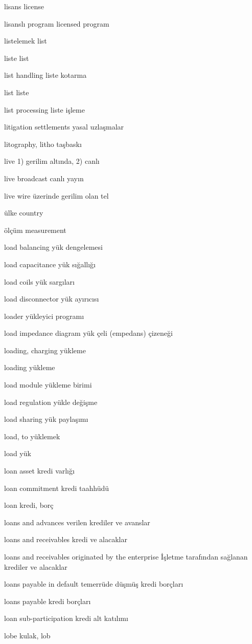 \documentclass[12pt,fleqn]{article}\usepackage{../../common}
\begin{document}
lisans license

lisanslı program licensed program

listelemek list

liste list

list handling liste kotarma

list liste

list processing liste işleme

litigation settlements yasal uzlaşmalar

litography, litho taşbaskı

live 1) gerilim altında, 2) canlı

live broadcast canlı yayın

live wire üzerinde gerilim olan tel

ülke country

ölçüm measurement

load balancing yük dengelemesi

load capacitance yük sığallığı

load coils yük sargıları

load disconnector yük ayırıcısı

loader yükleyici programı

load impedance diagram yük çeli (empedans) çizeneği

loading, charging yükleme

loading yükleme

load module yükleme birimi

load regulation yükle değişme

load sharing yük paylaşımı

load, to yüklemek

load yük

loan asset kredi varlığı

loan commitment kredi taahhüdü

loan kredi, borç

loans and advances verilen krediler ve avanslar

loans and receivables kredi ve alacaklar

loans and receivables originated by the enterprise İşletme tarafından sağlanan krediler ve alacaklar

loans payable in default temerrüde düşmüş kredi borçları

loans payable kredi borçları

loan sub-participation kredi alt katılımı

lobe kulak, lob
\end{document}
